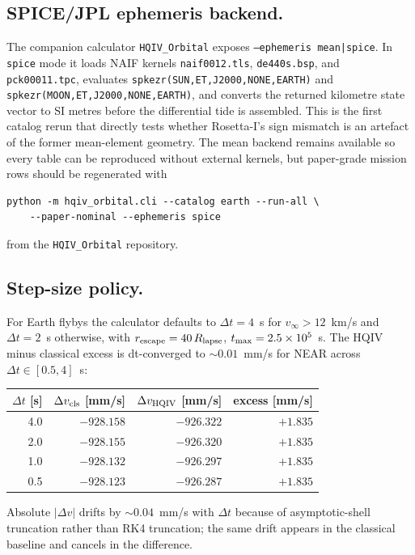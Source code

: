 \documentclass[11pt]{amsart}
\begin{document}
\subsection{SPICE/JPL ephemeris backend.}
The companion calculator \texttt{HQIV\_Orbital} exposes
\texttt{--ephemeris mean|spice}. In \texttt{spice} mode it loads NAIF kernels
\texttt{naif0012.tls}, \texttt{de440s.bsp}, and \texttt{pck00011.tpc}, evaluates
\texttt{spkezr(SUN,ET,J2000,NONE,EARTH)} and \texttt{spkezr(MOON,ET,J2000,NONE,EARTH)}, and
converts the returned kilometre state vector to SI metres before the differential tide is
assembled. This is the first catalog rerun that directly tests whether Rosetta-I's sign
mismatch is an artefact of the former mean-element geometry. The mean backend remains
available so every table can be reproduced without external kernels, but paper-grade
mission rows should be regenerated with
\begin{verbatim}
python -m hqiv_orbital.cli --catalog earth --run-all \
    --paper-nominal --ephemeris spice
\end{verbatim}
from the \texttt{HQIV\_Orbital} repository.

\subsection{Step-size policy.}
For Earth flybys the calculator defaults to $\Delta t=4$~s for $v_\infty>12$~km/s and
$\Delta t=2$~s otherwise, with $r_{\rm escape}=40\,R_{\rm lapse}$,
$t_{\rm max}=2.5\times 10^5$~s. The HQIV minus classical excess is dt-converged to
$\sim 0.01$~mm/s for NEAR across $\Delta t\in[0.5,4]$~s:

\begin{center}
\begin{tabular}{@{}rrrr@{}}
\toprule
$\Delta t$ [s] & $\Delta v_{\rm cls}$ [mm/s] & $\Delta v_{\rm HQIV}$ [mm/s] & excess [mm/s]\\
\midrule
4.0 & $-928.158$ & $-926.322$ & $+1.835$ \\
2.0 & $-928.155$ & $-926.320$ & $+1.835$ \\
1.0 & $-928.132$ & $-926.297$ & $+1.835$ \\
0.5 & $-928.123$ & $-926.287$ & $+1.835$ \\
\bottomrule
\end{tabular}
\end{center}
Absolute $|\Delta v|$ drifts by $\sim 0.04$~mm/s with $\Delta t$ because of asymptotic-shell
truncation rather than RK4 truncation; the same drift appears in the classical baseline and
cancels in the difference.
\end{document}
